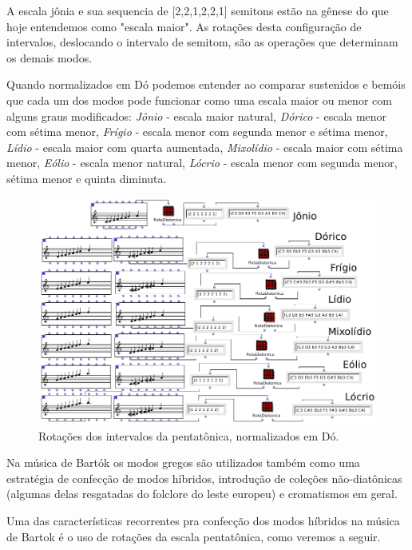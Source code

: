 \documentclass[
	12pt,				%
	openright,			%
	twoside,			%
	a4paper,			%
	english,			%
	french,				%
	spanish,			%
	brazil				%
	]{abntex2}
\begin{document}
A escala jônia e sua sequencia de [2,2,1,2,2,1] semitons estão na gênese do que hoje entendemos como "escala maior". As rotações desta configuração de intervalos, deslocando o intervalo de semitom, são as operações que determinam os demais modos. 

Quando normalizados em Dó podemos entender ao comparar sustenidos e bemóis que cada um dos modos pode funcionar como uma escala maior ou menor com alguns graus modificados: \textit{Jônio} - escala maior natural, \textit{Dórico} -   escala menor com sétima menor, \textit{Frígio} - escala menor com segunda menor e sétima menor, \textit{Lídio} - escala maior com quarta aumentada, \textit{Mixolídio} - escala maior com sétima menor, \textit{Eólio} - escala menor natural, \textit{Lócrio} - escala menor com segunda menor, sétima menor e quinta diminuta.

\begin{figure}[!h]
	\caption{\label{fig_grafico}Rotações dos intervalos da pentatônica, normalizados em Dó. }
	\begin{center}
	    \includegraphics[scale=0.5]{modal/modal.png}
	\end{center}
\end{figure}


Na música de Bartók os modos gregos são utilizados também como uma estratégia de confecção de modos híbridos, introdução de coleções não-diatônicas (algumas delas resgatadas do folclore do leste europeu) e cromatismos em geral.

Uma das características recorrentes pra confecção dos modos híbridos na música de Bartok é o uso de rotações da escala pentatônica, como veremos a seguir.
\end{document}
